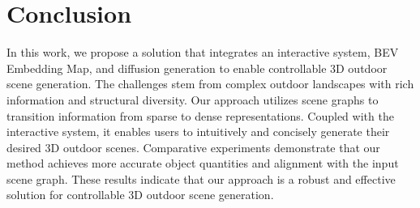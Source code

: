 \section{Conclusion}
In this work, we propose a solution that integrates an interactive system, BEV Embedding Map, and diffusion generation to enable controllable 3D outdoor scene generation. The challenges stem from complex outdoor landscapes with rich information and structural diversity. Our approach utilizes scene graphs to transition information from sparse to dense representations. Coupled with the interactive system, it enables users to intuitively and concisely generate their desired 3D outdoor scenes. Comparative experiments demonstrate that our method achieves more accurate object quantities and alignment with the input scene graph. These results indicate that our approach is a robust and effective solution for controllable 3D outdoor scene generation.
\label{sec:conclusion}